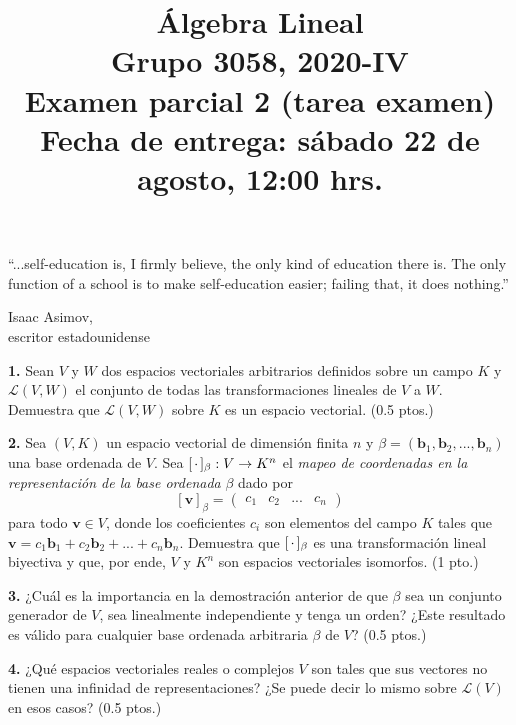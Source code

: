 \documentclass[a4paper]{article}
\begin{document}
\title{Álgebra Lineal \\ Grupo 3058, 2020-IV \\ Examen parcial 2 (tarea examen) \\ Fecha de entrega: sábado 22 de agosto, 12:00 hrs.}
\date{}
\maketitle

\epigraph{``...self-education is, I firmly believe, the only kind of education there is. The only function of a school is to make self-education easier; failing that, it does nothing.''}{\textemdash Isaac Asimov, \\ escritor estadounidense}

\vspace{1cm}
\textbf{1.} Sean $V$ y $W$ dos espacios vectoriales arbitrarios definidos sobre un campo $K$ y $\mathcal{L}(V,W)$ el conjunto de todas las transformaciones lineales de $V$ a $W$. Demuestra que $\mathcal{L}(V,W)$ sobre $K$ es un espacio vectorial. (0.5 ptos.)

\vspace{1cm}
\textbf{2.} Sea $(V,K)$ un espacio vectorial de dimensión finita $n$ y $\beta=(\mathbf{b}_1,\mathbf{b}_2,...,\mathbf{b}_n)$ una base ordenada de $V$. Sea $[\hspace{0.5mm} \cdot\hspace{0.5mm}]_\beta:V\to K^n$ el \emph{mapeo de coordenadas en la representación de la base ordenada} $\beta$ dado por $$[\mathbf{v}]_\beta=\begin{pmatrix} c_1&c_2&...&c_n \end{pmatrix}$$ para todo $\mathbf{v}\in V$, donde los coeficientes $c_i$ son elementos del campo $K$ tales que $\mathbf{v}=c_1\mathbf{b}_1+c_2\mathbf{b}_2+...+c_n\mathbf{b}_n$. Demuestra que $[\hspace{0.5mm} \cdot\hspace{0.5mm}]_\beta$ es una transformación lineal biyectiva y que, por ende, $V$ y $K^n$ son espacios vectoriales isomorfos. (1 pto.)

\vspace{1cm}
\textbf{3.} ¿Cuál es la importancia en la demostración anterior de que $\beta$ sea un conjunto generador de $V$, sea linealmente independiente y tenga un orden? ¿Este resultado es válido para cualquier base ordenada arbitraria $\beta$ de $V$?  (0.5 ptos.)

\vspace{1cm}
\textbf{4.} ¿Qué espacios vectoriales reales o complejos $V$ son tales que sus vectores no tienen una infinidad de representaciones? ¿Se puede decir lo mismo sobre $\mathcal{L}(V)$ en esos casos? (0.5 ptos.)  
\end{document}
